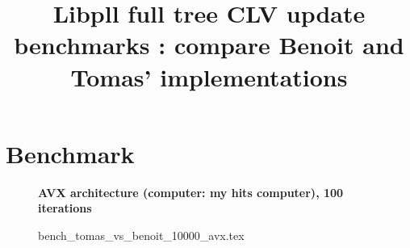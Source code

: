 \documentclass[a4paper]{article}
\begin{document}
\newcommand*{\figuretitle}[1]{%
    {\centering%
    \textbf{#1}%
    \par\medskip}%
}


\title{Libpll full tree CLV update benchmarks : compare Benoit and Tomas' implementations}
\maketitle



\section{Benchmark}


\begin{figure}[!htb]
\figuretitle{AVX architecture (computer: my hits computer), 100 iterations}
{bench_tomas_vs_benoit_10000_avx.tex}
\end{figure}
\end{document}

